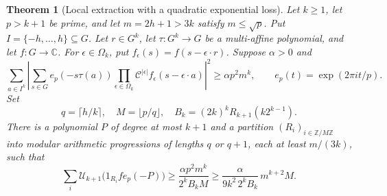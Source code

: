 \documentclass[11pt,letterpaper]{article}
\numberwithin{equation}{section}
\newtheorem{theorem}{Theorem}[section]
\theoremstyle{definition}
\theoremstyle{remark}
\newcommand{\1}{\mathbf 1}
\begin{document}
\begin{theorem}[Local extraction with a quadratic exponential loss]
\label{gsr:fp:04:pat:local}
Let $k\ge1$, let $p>k+1$ be prime, and let
$m=2h+1>3k$ satisfy $m\le\sqrt p$. Put
$I=\{-h,\ldots,h\}\subseteq G$. Let $r\in G^k$, let
$\tau:G^k\to G$ be a multi-affine polynomial, and let $f:G\to\mathbb C$.
For $\epsilon\in\Omega_k$, put
$f_\epsilon(s)=f(s-\epsilon\cdot r)$. Suppose $\alpha>0$ and
\begin{equation}\label{gsr:fp:04:pat:hypothesis}
 \sum_{a\in I^k}
 \left|\sum_{s\in G}e_p(-s\tau(a))
      \prod_{\epsilon\in\Omega_k}
       \mathcal C^{|\epsilon|}f_\epsilon(s-\epsilon\cdot a)
 \right|^2
 \ge\alpha p^2m^k,
 \qquad e_p(t)=\exp(2\pi i t/p).
\end{equation}
Set
\[
 q=\lceil h/k\rceil,\quad M=\lfloor p/q\rfloor,
 \quad B_k=(2k)^kR_{k+1}(k2^{k-1}).
\]
There is a polynomial $P$ of degree at most $k+1$ and a partition
$(R_i)_{i\in\mathbb Z/M\mathbb Z}$ into modular arithmetic progressions
of lengths $q$ or $q+1$, each at least $m/(3k)$, such that
\begin{equation}\label{gsr:fp:04:pat:energy-conclusion}
 \sum_i\mathcal U_{k+1}\bigl(1_{R_i}f e_p(-P)\bigr)
 \ge\frac{\alpha p^2m^k}{2^kB_kM}
 \ge\frac{\alpha}{9k^2\,2^kB_k}\,m^{k+2}M.
\end{equation}
\end{theorem}
\end{document}
